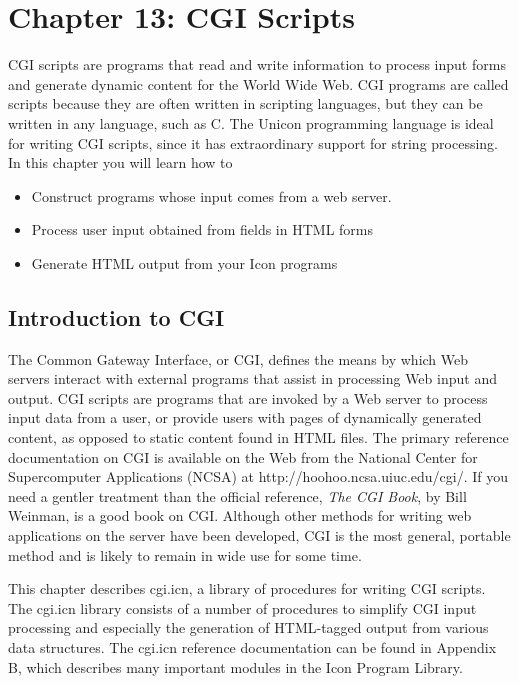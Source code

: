 \clearpage\section{Chapter 13: CGI Scripts}
CGI scripts are programs that read and write information to
process input forms and generate dynamic content for the World Wide
Web. CGI programs are called {\textquotedbl}scripts{\textquotedbl}
because they are often written in scripting
languages, but they can be written in any language, such as C. The
Unicon programming language is ideal for writing CGI scripts, since it
has extraordinary support for string processing. In this chapter you
will learn how to

\begin{itemize}
\item Construct programs whose input comes from a web server.
\item Process user input obtained from fields in HTML forms
\item Generate HTML output from your Icon programs
\end{itemize}
\subsection{Introduction to CGI}
The Common Gateway Interface, or CGI, defines the means by which Web
servers interact with external programs that assist in processing Web
input and output. CGI scripts are programs that are invoked by a Web
server to process input data from a user, or provide users with pages
of dynamically generated content, as opposed to static content found in
HTML files. The primary
reference documentation on CGI is
available on the Web from the National Center for Supercomputer
Applications (NCSA) at \textsf{http://hoohoo.ncsa.uiuc.edu/cgi/}. If
you need a gentler treatment than the official reference, \textit{The
CGI Book}, by Bill Weinman, is a good book on CGI. Although other
methods for writing web applications on the server have been developed,
CGI is the most general, portable method and is likely to remain in
wide use for some time.

This chapter describes \textsf{cgi.icn}, a library of procedures for
writing CGI scripts. The \textsf{cgi.icn} library consists of a number
of procedures to simplify CGI input processing and especially the
generation of HTML-tagged output from various data structures. The
\textsf{cgi.icn} reference documentation can be found in Appendix B,
which describes many important modules in the Icon Program Library.

